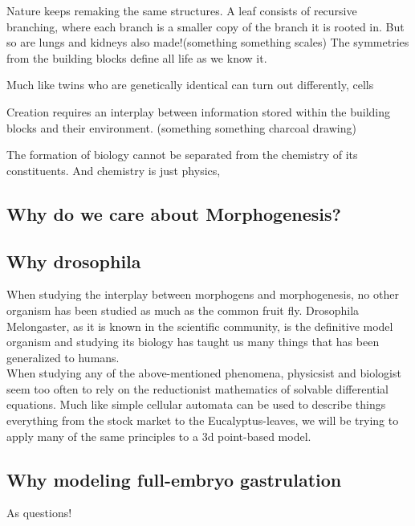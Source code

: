Nature keeps remaking the same structures. A leaf consists of recursive branching, where each branch is a smaller copy of the branch it is rooted in. But so are lungs and kidneys also made!(something something scales)  The symmetries from the building blocks define all life as we know it. 

Much like twins who are genetically identical can turn out differently, cells

Creation requires an interplay between information stored within the building blocks and their environment. (something something charcoal drawing)

The formation of biology cannot be separated from the chemistry of its constituents. And chemistry is just physics, 

\subsection{Why do we care about Morphogenesis?}


\subsection{Why drosophila}
When studying the interplay between morphogens and morphogenesis, no other organism has been studied as much as the common fruit fly. Drosophila Melongaster, as it is known in the scientific community, is the definitive model organism and studying its biology has taught us many things that has been generalized to humans. \\


When studying any of the above-mentioned phenomena, physicsist and biologist seem too often to rely on the reductionist mathematics of solvable differential equations. Much like simple cellular automata can be used to describe things everything from the stock market to the Eucalyptus-leaves, we will be trying to apply many of the same principles to a 3d point-based model.

\subsection{Why modeling full-embryo gastrulation }
As questions!








